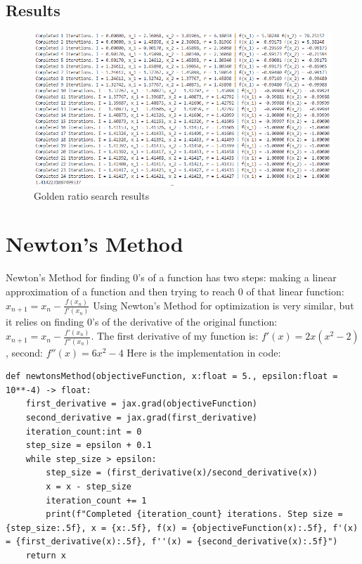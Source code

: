 \documentclass{article}
\begin{document}
        \subsection*{Results}
            \begin{figure}[H]
                \centering
                \includegraphics[width=1\textwidth]{golden-ratio.png}
                \caption{Golden ratio search results}
                \label{fig:ml}
            \end{figure}
    \section{Newton's Method}
        Newton's Method for finding 0's of a function has two steps: making a linear approximation of a function and then trying to reach 0 of that linear function: $x_{n+1} = x_n - \frac{f(x_n)}{f'(x_n)}$ Using Newton's Method for optimization is very similar, but it relies on finding 0's of the derivative of the original function: $x_{n+1} = x_n - \frac{f'(x_n)}{f''(x_n)}$. The first derivative of my function is: $f'(x) = 2x(x^2 - 2)$, second: $f''(x) = 6x^2 - 4$ Here is the implementation in code:
        \begin{verbatim}
def newtonsMethod(objectiveFunction, x:float = 5., epsilon:float = 10**-4) -> float:
    first_derivative = jax.grad(objectiveFunction)
    second_derivative = jax.grad(first_derivative)
    iteration_count:int = 0
    step_size = epsilon + 0.1
    while step_size > epsilon:
        step_size = (first_derivative(x)/second_derivative(x))
        x = x - step_size
        iteration_count += 1
        print(f"Completed {iteration_count} iterations. Step size = {step_size:.5f}, x = {x:.5f}, f(x) = {objectiveFunction(x):.5f}, f'(x) = {first_derivative(x):.5f}, f''(x) = {second_derivative(x):.5f}")
    return x
    \end{verbatim}
\end{document}
